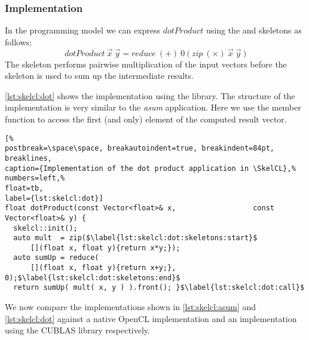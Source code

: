 \subsubsection*{\SkelCL Implementation}
In the \SkelCL programming model we can express $dotProduct$ using the \zip and \reduce skeletons as follows:
\begin{equation}
  dotProduct\ \vec{x}\ \vec{y} = reduce\ (+)\ 0\ \big(\ zip\ (\times)\ \vec{x}\ \vec{y}\ \big)
\end{equation}
The \zip skeleton performs pairwise multiplication of the input vectors before the \reduce skeleton is used to sum up the intermediate results.

\autoref{lst:skelcl:dot} shows the implementation using the \SkelCL library.
The structure of the implementation is very similar to the \emph{asum} application.
Here we use the  member function to access the first (and only) element of the computed result vector.

\begin{lstlisting}[%                                                             
postbreak=\space\space, breakautoindent=true, breakindent=84pt, breaklines,
caption={Implementation of the dot product application in \SkelCL},%
numbers=left,%
float=tb,
label={lst:skelcl:dot}]
float dotProduct(const Vector<float>& x,                  const Vector<float>& y) {
  skelcl::init();
  auto mult  = zip($\label{lst:skelcl:dot:skeletons:start}$
      [](float x, float y){return x*y;});
  auto sumUp = reduce(
      [](float x, float y){return x+y;}, 0);$\label{lst:skelcl:dot:skeletons:end}$
  return sumUp( mult( x, y ) ).front(); }$\label{lst:skelcl:dot:call}$
\end{lstlisting}





\bigskip

We now compare the \SkelCL implementations shown in \autoref{lst:skelcl:asum} and \autoref{lst:skelcl:dot} against a native OpenCL implementation and an implementation using the CUBLAS library respectively.


